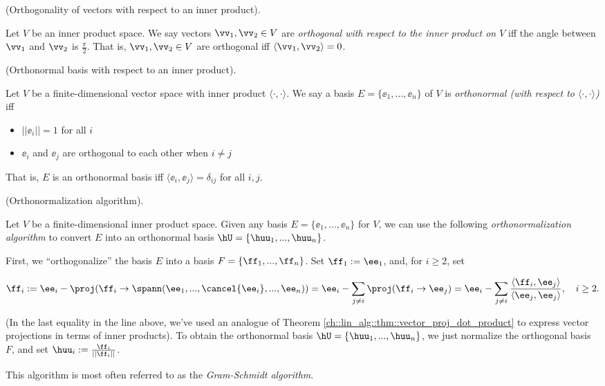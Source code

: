 \begin{defn}
    (Orthogonality of vectors with respect to an inner product). 
    
    Let $V$ be an inner product space. We say vectors $\vv_1, \vv_2 \in V$ are \textit{orthogonal with respect to the inner product on $V$} iff the angle between $\vv_1$ and $\vv_2$ is $\frac{\pi}{2}$. That is, $\vv_1, \vv_2 \in V$ are orthogonal iff $\langle \vv_1, \vv_2 \rangle = 0$.
\end{defn}

\newpage

\begin{defn}
    (Orthonormal basis with respect to an inner product).
    
     Let $V$ be a finite-dimensional vector space with inner product $\langle \cdot, \cdot \rangle$. We say a basis $E = \{\ee_1, ..., \ee_n\}$ of $V$ is \textit{orthonormal (with respect to $\langle \cdot, \cdot \rangle$)} iff
     
     \begin{itemize}
         \item $||\ee_i|| = 1$ for all $i$
         \item $\ee_i$ and $\ee_j$ are orthogonal to each other when $i \neq j$
     \end{itemize}
     
     That is, $E$ is an orthonormal basis iff $\langle \ee_i, \ee_j \rangle = \delta_{ij}$ for all $i, j$.
\end{defn}

\begin{theorem}
\label{ch::bilinear_forms_metric_tensors::theorem::Gram-Schmidt}
    (Orthonormalization algorithm).
    
    Let $V$ be a finite-dimensional inner product space. Given any basis $E = \{\ee_1, ..., \ee_n\}$ for $V$, we can use the following \textit{orthonormalization algorithm} to convert $E$ into an orthonormal basis $\hU = \{\huu_1, ..., \huu_n\}$.
    
    First, we ``orthogonalize'' the basis $E$ into a basis $F = \{\ff_1, ..., \ff_n\}$. Set $\ff_1 := \ee_1$, and, for $i \geq 2$, set
    
    \begin{align*}
        \ff_i := \ee_i - \proj(\ff_i \rightarrow \spann(\ee_1, ..., \cancel{\ee_i}, ..., \ee_n)) = \ee_i - \sum_{j \neq i} \proj(\ff_i \rightarrow \ee_j) = \ee_i - \sum_{j \neq i} \frac{\langle \ff_i, \ee_j \rangle}{\langle \ee_j, \ee_j \rangle}, \quad i \geq 2.
    \end{align*}
    
    (In the last equality in the line above, we've used an analogue of Theorem \ref{ch::lin_alg::thm::vector_proj_dot_product} to express vector projections in terms of inner products). 
    To obtain the orthonormal basis $\hU = \{\huu_1, ..., \huu_n\}$, we just normalize the orthogonal basis $F$, and set $\huu_i := \frac{\ff_i}{||\ff_i||}$.

    This algorithm is most often referred to as the \textit{Gram-Schmidt algorithm}.
\end{theorem}

